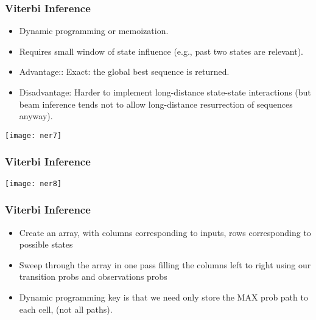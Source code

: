 \begin{frame}[fragile]\frametitle{Viterbi Inference}
  \begin{itemize}
  \item Dynamic programming or memoization.
  \item Requires small window of state influence (e.g., past two states are relevant).
  \item Advantage:: Exact: the global best sequence is returned.
  \item Disadvantage: Harder to implement long-distance state-state interactions (but beam inference tends not
to allow long-distance resurrection of sequences anyway).
  \end{itemize}
\begin{center}
\texttt{[image: ner7]}
\end{center}
\end{frame}

\begin{frame}[fragile]\frametitle{Viterbi Inference}
\begin{center}
\texttt{[image: ner8]}
\end{center}
\end{frame}

\begin{frame}[fragile]\frametitle{Viterbi Inference}
  \begin{itemize}
  \item Create an array, with columns corresponding to inputs, rows corresponding to possible states
  \item Sweep through the array in one pass filling the columns left to right using our transition probs and observations probs
  \item Dynamic programming key is that we need only store the MAX prob path to each cell, (not all paths).
  \end{itemize}
\end{frame}









